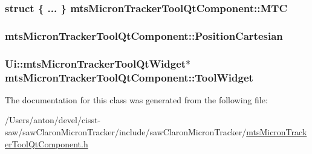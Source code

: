 \subsubsection[{M\+T\+C}]{\setlength{\rightskip}{0pt plus 5cm}struct \{ ... \}   mts\+Micron\+Tracker\+Tool\+Qt\+Component\+::\+M\+T\+C\hspace{0.3cm}{\ttfamily [protected]}}\label{classmts_micron_tracker_tool_qt_component_a8386ee26f85095141f5ad40fda1e6f50}
\hypertarget{classmts_micron_tracker_tool_qt_component_a9ce46838a73866850a7a06a339b4d121}{}
\subsubsection[{Position\+Cartesian}]{ mts\+Micron\+Tracker\+Tool\+Qt\+Component\+::\+Position\+Cartesian}\label{classmts_micron_tracker_tool_qt_component_a9ce46838a73866850a7a06a339b4d121}
\hypertarget{classmts_micron_tracker_tool_qt_component_a78d45496b35b856b483e6600599dc4a4}{}
\subsubsection[{Tool\+Widget}]{\setlength{\rightskip}{0pt plus 5cm}Ui\+::mts\+Micron\+Tracker\+Tool\+Qt\+Widget$\ast$ mts\+Micron\+Tracker\+Tool\+Qt\+Component\+::\+Tool\+Widget\hspace{0.3cm}{\ttfamily [protected]}}\label{classmts_micron_tracker_tool_qt_component_a78d45496b35b856b483e6600599dc4a4}


The documentation for this class was generated from the following file\+:\begin{DoxyCompactItemize}
\item 
/\+Users/anton/devel/cisst-\/saw/saw\+Claron\+Micron\+Tracker/include/saw\+Claron\+Micron\+Tracker/\hyperlink{mts_micron_tracker_tool_qt_component_8h}{mts\+Micron\+Tracker\+Tool\+Qt\+Component.\+h}\end{DoxyCompactItemize}
